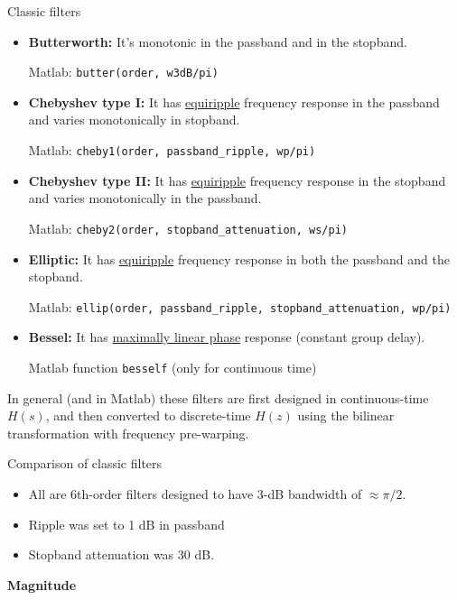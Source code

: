 \documentclass[10pt, handout]{beamer}
\begin{document}
\begin{frame}{Classic filters}
	\begin{itemize}
		\item \textbf{Butterworth:}
		It's monotonic in the passband and in the stopband.
		
		Matlab: \texttt{butter(order, w3dB/pi)}
		\item \textbf{Chebyshev type I:}
		It has \underline{equiripple} frequency response in the passband and varies monotonically in stopband.
		
		Matlab: \texttt{cheby1(order, passband\_ripple, wp/pi)}
		\item \textbf{Chebyshev type II:}
		It has \underline{equiripple} frequency response in the stopband and varies monotonically in the passband.
		
		Matlab: \texttt{cheby2(order, stopband\_attenuation, ws/pi)}
		\item \textbf{Elliptic:}
		It has \underline{equiripple} frequency response in both the passband and the stopband.
		
		Matlab: \texttt{ellip(order, passband\_ripple, stopband\_attenuation, wp/pi)}
		
		\item \textbf{Bessel:}
		It has \underline{maximally linear phase} response (constant group delay).
		
		Matlab function \texttt{besself} (only for continuous time)
	\end{itemize}

	In general (and in Matlab) these filters are first designed in continuous-time $H(s)$, and then converted to discrete-time $H(z)$ using the bilinear transformation with frequency pre-warping.
\end{frame}

%
\begin{frame}{Comparison of classic filters}
\begin{itemize}
	\item All are 6th-order filters designed to have 3-dB bandwidth of $\approx \pi/2$.
	\item Ripple was set to 1 dB in passband
	\item Stopband attenuation was 30 dB.
\end{itemize}

\textbf{Magnitude}
\begin{center}
	\resizebox{0.75\linewidth}{!}{}
\end{center}

\end{frame}
\end{document}
